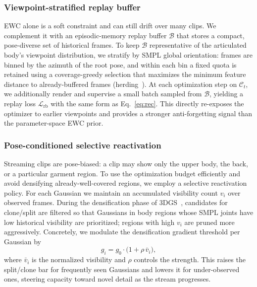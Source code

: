 \subsubsection{Viewpoint-stratified replay buffer}\label{sec:method:replay}
EWC alone is a soft constraint and can still drift over many clips. We
complement it with an episodic-memory replay buffer $\mathcal{B}$ that
stores a compact, pose-diverse set of historical frames. To keep $\mathcal{B}$
representative of the articulated body's viewpoint distribution, we
stratify by SMPL global orientation: frames are binned by the azimuth of
the root pose, and within each bin a fixed quota is retained using a
coverage-greedy selection that maximizes the minimum feature distance to
already-buffered frames (herding~\cite{rebuffi2017icarl}). At each
optimization step on $\mathcal{C}_t$, we additionally render and supervise
a small batch sampled from $\mathcal{B}$, yielding a replay loss
$\mathcal{L}_{\mathrm{rb}}$ with the same form as
Eq.~\eqref{eq:rec}. This directly re-exposes the optimizer to earlier
viewpoints and provides a stronger anti-forgetting signal than the
parameter-space EWC prior.

\subsubsection{Pose-conditioned selective reactivation}\label{sec:method:react}
Streaming clips are pose-biased: a clip may show only the upper body, the
back, or a particular garment region. To use the optimization budget
efficiently and avoid densifying already-well-covered regions, we employ
a selective reactivation policy. For each Gaussian we maintain an
accumulated visibility count $v_i$ over observed frames. During the
densification phase of 3DGS~\cite{kerbl3Dgaussians}, candidates for
clone/split are filtered so that Gaussians in body regions whose SMPL
joints have low historical visibility are prioritized; regions with high
$v_i$ are pruned more aggressively. Concretely, we modulate the
densification gradient threshold per Gaussian by
\begin{equation}
  g_i = g_0 \cdot \bigl(1 + \rho\, \bar{v}_i\bigr),
  \label{eq:react}
\end{equation}
where $\bar{v}_i$ is the normalized visibility and $\rho$ controls the
strength. This raises the split/clone bar for frequently seen Gaussians
and lowers it for under-observed ones, steering capacity toward novel
detail as the stream progresses.

